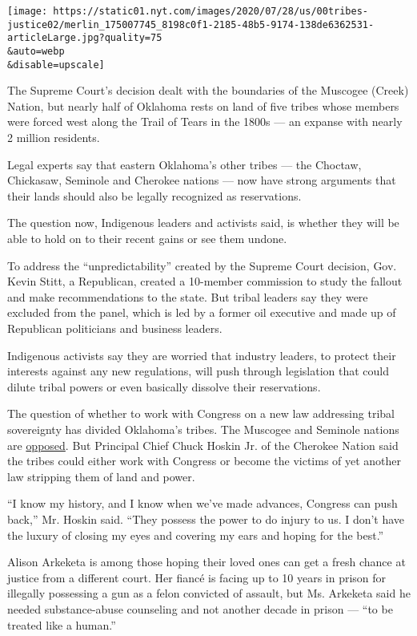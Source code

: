 \texttt{[image: https://static01.nyt.com/images/2020/07/28/us/00tribes-justice02/merlin\_175007745\_8198c0f1-2185-48b5-9174-138de6362531-articleLarge.jpg?quality=75\\\&auto=webp\\\&disable=upscale]}

The Supreme Court's decision dealt with the boundaries of the Muscogee
(Creek) Nation, but nearly half of Oklahoma rests on land of five tribes
whose members were forced west along the Trail of Tears in the 1800s ---
an expanse with nearly 2 million residents.

Legal experts say that eastern Oklahoma's other tribes --- the Choctaw,
Chickasaw, Seminole and Cherokee nations --- now have strong arguments
that their lands should also be legally recognized as reservations.

The question now, Indigenous leaders and activists said, is whether they
will be able to hold on to their recent gains or see them undone.

To address the ``unpredictability'' created by the Supreme Court
decision, Gov. Kevin Stitt, a Republican, created a 10-member commission
to study the fallout and make recommendations to the state. But tribal
leaders say they were excluded from the panel, which is led by a former
oil executive and made up of Republican politicians and business
leaders.

Indigenous activists say they are worried that industry leaders, to
protect their interests against any new regulations, will push through
legislation that could dilute tribal powers or even basically dissolve
their reservations.

The question of whether to work with Congress on a new law addressing
tribal sovereignty has divided Oklahoma's tribes. The Muscogee and
Seminole nations are
\href{https://tulsaworld.com/news/local/crime-and-courts/creek-seminole-tribes-deny-pact-with-state-on-jurisdictional-issues/article_d5e11094-2cd8-53a6-9686-13768e05ccce.html}{opposed}.
But Principal Chief Chuck Hoskin Jr. of the Cherokee Nation said the
tribes could either work with Congress or become the victims of yet
another law stripping them of land and power.

``I know my history, and I know when we've made advances, Congress can
push back,'' Mr. Hoskin said. ``They possess the power to do injury to
us. I don't have the luxury of closing my eyes and covering my ears and
hoping for the best.''

Alison Arkeketa is among those hoping their loved ones can get a fresh
chance at justice from a different court. Her fiancé is facing up to 10
years in prison for illegally possessing a gun as a felon convicted of
assault, but Ms. Arkeketa said he needed substance-abuse counseling and
not another decade in prison --- ``to be treated like a human.''

